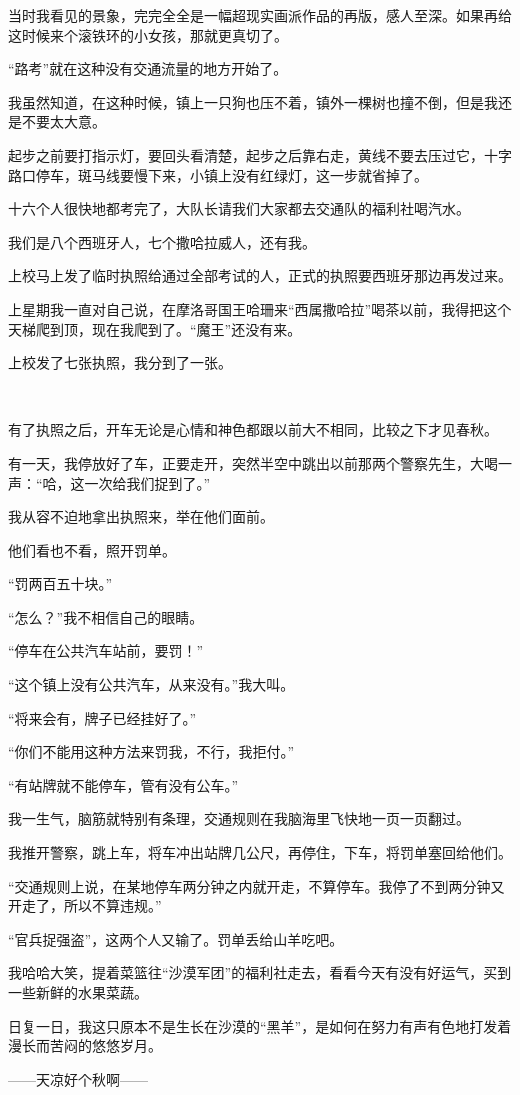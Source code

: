 \par 当时我看见的景象，完完全全是一幅超现实画派作品的再版，感人至深。如果再给这时候来个滚铁环的小女孩，那就更真切了。
\par “路考”就在这种没有交通流量的地方开始了。
\par 我虽然知道，在这种时候，镇上一只狗也压不着，镇外一棵树也撞不倒，但是我还是不要太大意。
\par 起步之前要打指示灯，要回头看清楚，起步之后靠右走，黄线不要去压过它，十字路口停车，斑马线要慢下来，小镇上没有红绿灯，这一步就省掉了。
\par 十六个人很快地都考完了，大队长请我们大家都去交通队的福利社喝汽水。
\par 我们是八个西班牙人，七个撒哈拉威人，还有我。
\par 上校马上发了临时执照给通过全部考试的人，正式的执照要西班牙那边再发过来。
\par 上星期我一直对自己说，在摩洛哥国王哈珊来“西属撒哈拉”喝茶以前，我得把这个天梯爬到顶，现在我爬到了。“魔王”还没有来。
\par 上校发了七张执照，我分到了一张。
\par  
\par 有了执照之后，开车无论是心情和神色都跟以前大不相同，比较之下才见春秋。
\par 有一天，我停放好了车，正要走开，突然半空中跳出以前那两个警察先生，大喝一声：“哈，这一次给我们捉到了。”
\par 我从容不迫地拿出执照来，举在他们面前。
\par 他们看也不看，照开罚单。
\par “罚两百五十块。”
\par “怎么？”我不相信自己的眼睛。
\par “停车在公共汽车站前，要罚！”
\par “这个镇上没有公共汽车，从来没有。”我大叫。
\par “将来会有，牌子已经挂好了。”
\par “你们不能用这种方法来罚我，不行，我拒付。”
\par “有站牌就不能停车，管有没有公车。”
\par 我一生气，脑筋就特别有条理，交通规则在我脑海里飞快地一页一页翻过。
\par 我推开警察，跳上车，将车冲出站牌几公尺，再停住，下车，将罚单塞回给他们。
\par “交通规则上说，在某地停车两分钟之内就开走，不算停车。我停了不到两分钟又开走了，所以不算违规。”
\par “官兵捉强盗”，这两个人又输了。罚单丢给山羊吃吧。
\par 我哈哈大笑，提着菜篮往“沙漠军团”的福利社走去，看看今天有没有好运气，买到一些新鲜的水果菜蔬。
\par 日复一日，我这只原本不是生长在沙漠的“黑羊”，是如何在努力有声有色地打发着漫长而苦闷的悠悠岁月。
\par ——天凉好个秋啊——


